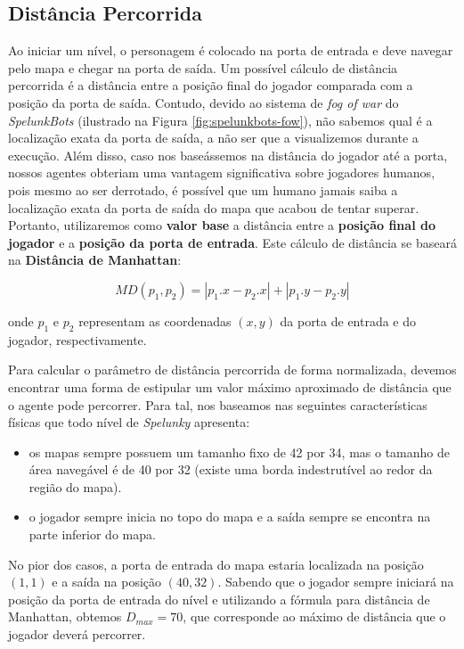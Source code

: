 \subsection{Distância Percorrida}
Ao iniciar um nível, o personagem é colocado na porta de entrada e deve navegar
pelo mapa e chegar na porta de saída. Um possível cálculo de distância
percorrida é a distância entre a posição final do jogador comparada com a
posição da porta de saída. Contudo, devido ao sistema de \textit{fog of war} do
\textit{SpelunkBots} (ilustrado na Figura \ref{fig:spelunkbots-fow}), não
sabemos qual é a localização exata da porta de saída, a não ser que a
visualizemos durante a execução. Além disso, caso nos baseássemos na distância
do jogador até a porta, nossos agentes obteriam uma vantagem significativa sobre
jogadores humanos, pois mesmo ao ser derrotado, é possível que um humano jamais
saiba a localização exata da porta de saída do mapa que acabou de tentar
superar. Portanto, utilizaremos como \textbf{valor base} a distância entre a
\textbf{posição final do jogador} e a \textbf{posição da porta de entrada}. Este
cálculo de distância se baseará na \textbf{Distância de Manhattan}:

\begin{equation}
	\label{eq:manhattan-distance}
	MD(p_1,p_2) = |p_1.x - p_2.x| + |p_1.y - p_2.y|
\end{equation}

onde $p_1$ e $p_2$ representam as coordenadas $(x,y)$ da porta de entrada e do
jogador, respectivamente. 

Para calcular o parâmetro de distância percorrida de forma normalizada, devemos
encontrar uma forma de estipular um valor máximo aproximado de distância que o
agente pode percorrer. Para tal, nos baseamos nas seguintes características
físicas que todo nível de \textit{Spelunky} apresenta:

\begin{itemize}
	\item os mapas sempre possuem um tamanho fixo de 42 por 34, mas o tamanho de
		área navegável é de 40 por 32 (existe uma borda indestrutível ao redor
		da região do mapa).
	\item o jogador sempre inicia no topo do mapa e a saída sempre se encontra
		na parte inferior do mapa.
\end{itemize}

No pior dos casos, a porta de entrada do mapa estaria localizada na posição
$(1,1)$ e a saída na posição $(40,32)$. Sabendo que o jogador sempre iniciará na
posição da porta de entrada do nível e utilizando a fórmula para distância de
Manhattan, obtemos $D_{max} = 70$, que corresponde ao máximo de distância que o
jogador deverá percorrer.

